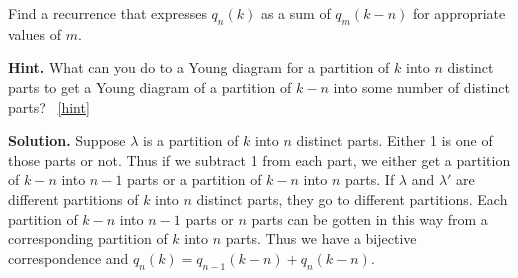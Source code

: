 \documentclass{book}
\begin{document}
\setcounter{project}{313}
\addtocounter{project}{-1}
\begin{activity}[]\label{activity-306}
\hypertarget{p-1576}{}%
Find a recurrence that expresses \(q_n(k)\) as a sum of \(q_m(k-n)\) for appropriate values of \(m\).%
\par\smallskip%
\noindent\textbf{Hint.}\hypertarget{hint-201}{}\quad%
\hypertarget{p-1577}{}%
What can you do to a Young diagram for a partition of \(k\) into \(n\) distinct parts to get a Young diagram of a partition of \(k-n\) into some number of distinct parts?%
~\hfill{\tiny\hyperlink{a-313}{[hint]}\hypertarget{q-313}{}}\par\smallskip%
\noindent\textbf{Solution.}\hypertarget{solution-216}{}\quad%
\hypertarget{p-1578}{}%
Suppose \(\lambda\) is a partition of \(k\) into \(n\) distinct parts. Either 1 is one of those parts or not. Thus if we subtract 1 from each part, we either get a partition of \(k-n\) into \(n-1\) parts or a partition of \(k-n\) into \(n\) parts. If \(\lambda\) and \(\lambda'\) are different partitions of \(k\) into \(n\) distinct parts, they go to different partitions. Each partition of \(k-n\) into \(n-1\) parts or \(n\) parts can be gotten in this way from a corresponding partition of \(k\) into \(n\) parts. Thus we have a bijective correspondence and \(q_n(k)=q_{n-1}(k-n) + q_{n}(k-n)\).%
\end{activity}
\end{document}
